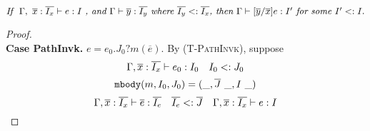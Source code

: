 \begin{lemma}~\label{lemma1}
$\textit{If } \ \judgeewf {\Gamma, \ \overline{x}:\overline{I_x}} { e : I } \textit{ , and }
\judgeewf {\Gamma} {\overline{y}:\overline{I_y}} \textit{ where } \overline{I_y} \subtype \overline{I_x}
\textit{, then } \judgeewf {\Gamma} {[\overline{y}/\overline{x}]e : I'} \textit{ for some } I' \subtype I.
$

\begin{proof}

\begin{comment}
\noindent \textbf{Case Var.}
$ e = x \quad I = \Gamma(x) $. \\
If $x \notin \overline{x}$, then the conclusion is immediate, since $[\overline{y}/\overline{x}]x = x$.
On the other hand, if $x = x_i$ and $I = {I_x}_i$, then since $[\overline{y}/\overline{x}]x = [\overline{y}/\overline{x}]x_i = y_i$,
letting $I' = {I_y}_i$ finishes the case.

\noindent \textbf{Case New.}
$e = \new I$ and there are no term for substitution, the conclusion is obvious.
\noindent \textbf{Case Invk.}
$ e = e_0.m(\overline{e}) \quad
  \judgeewf {\Gamma, \overline{x}:\overline{I_x}} {e_0 : I_0} $
$$ mtype(m, I_0) = \overline{I_e} \rightarrow J $$
$$ \judgeewf {\Gamma, \overline{x}:\overline{I_x}} {\overline{e}:\overline{I}} \quad
    \overline{I} \subtype \overline{I_e} $$
By induction hypothesis, there are some $I_0'$ and $\overline{I_e'}$ such that
    $$ \judgeewf {\Gamma} {[\overline{y}/\overline{x}]e_0 : I_0'} \quad 
        I_0' \subtype I_0 $$
    $$ \judgeewf {\Gamma} {[\overline{y}/\overline{x}]\overline{e} : \overline{I_e'}} \quad  
        \overline{I_e'} \subtype \overline{I}$$    
By lemma~\ref{lemma2}, 
    $mtype(m, I_0') = \overline{I_e} \rightarrow J$.
    
\noindent Then $\overline{I_e'} \subtype \overline{I_e}$ by the transitivity of $\subtype$.
Therefore, by the rule \textsc{(T-Invk)}, 
    $\judgeewf {\Gamma} {[\overline{y}/\overline{x}]e_0.m([\overline{y}/\overline{x}]\overline{e}) : J}$.

\noindent \textbf{Case PathInvk.}
$ e = e_0.I::m(\overline{e}) $ and proof is similar as case Var.

\noindent \textbf{Case SuperInvk.}
$ e = \kwsuper.I::m(\overline{e}) $ \\
Suppose $\judgeewf {\Gamma} {\kwthis : I_0}$, the following proof should be similar as case Var.
\end{comment}
~\\
\indent\textbf{Case PathInvk.} $e = e_0.J_0?m(\overline{e})$. By \textsc{(T-PathInvk)}, suppose
	$$\Gamma, \overline{x}:\overline{I_x} \; {\vdash} \; e_0 : I_0 \quad I_0 <: J_0$$
	$$\mbody(m, I_0, J_0) = (\_, \overline{J}\ \_, I\ \_)$$
	$$\Gamma, \overline{x}:\overline{I_x} \; {\vdash} \; \overline{e} : \overline{I_e} \quad 
	  \overline{I_e} <: \overline{J} \quad \Gamma, \overline{x}:\overline{I_x} \; {\vdash} \; e : I$$


\end{proof}
\end{lemma}
